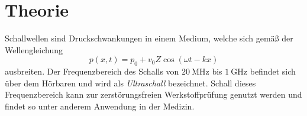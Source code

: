 \section{Theorie}
\label{sec:Theorie}
Schallwellen sind Druckschwankungen in einem Medium, welche sich gemäß der Wellengleichung
\begin{equation*}
    \label{eqn:Schallwelle}
    p(x,t) = p_0 + v_0 Z \cos \left(\omega t - kx\right)
\end{equation*}
ausbreiten.
Der Frequenzbereich des Schalls von $\qty{20}{\mega\hertz}$ bis $\qty{1}{\giga\hertz}$ befindet sich über dem Hörbaren und wird als \textit{Ultraschall} bezeichnet.
Schall dieses Frequenzbereich kann zur zerstörungsfreien Werkstoffprüfung genutzt werden und findet so unter anderem Anwendung in der Medizin.

